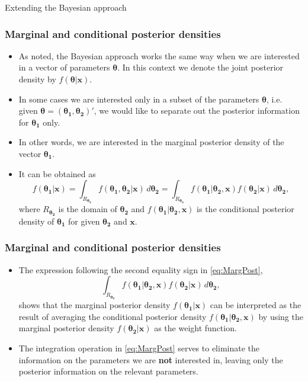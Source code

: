 \documentclass[10pt]{beamer}
\theoremstyle{definition}
\begin{document}
\begin{section}{Extending the Bayesian approach}
\begin{frame}[fragile]
\frametitle{Marginal and conditional posterior densities}
\begin{itemize}\itemsep1em
\item As noted, the Bayesian approach works the same way when we are interested in a vector of parameters $\boldsymbol{\theta}$. In this context we denote the joint posterior density by $f(\boldsymbol{\theta}|\mathbf{x})$.
\item In some cases we are interested only in a subset of the parameters $\boldsymbol{\theta}$, i.e. given $\boldsymbol{\theta}=\left(\boldsymbol{\theta_1},\boldsymbol{\theta_2}\right)'$, we would like to separate out the posterior information for $\boldsymbol{\theta_1}$ only.
\item In other words, we are interested in the marginal posterior density of the vector $\boldsymbol{\theta_1}$.
\item It can be obtained as \begin{equation}
\label{eq:MargPost}f(\boldsymbol{\theta_1}|\mathbf{x}) = \int_{R_{\boldsymbol{\theta_2}}}f(\boldsymbol{\theta_1},\boldsymbol{\theta_2}|\mathbf{x})\,d\boldsymbol{\theta_2} = \int_{R_{\boldsymbol{\theta_2}}}f(\boldsymbol{\theta_1}|\boldsymbol{\theta_2},\mathbf{x})f(\boldsymbol{\theta_2|\mathbf{x}})\,d\boldsymbol{\theta_2},
\end{equation}
where $R_{\boldsymbol{\theta_2}}$ is the domain of $\boldsymbol{\theta_2}$ and $f(\boldsymbol{\theta_1}|\boldsymbol{\theta_2},\mathbf{x})$
is the conditional posterior density of $\boldsymbol{\theta_1}$ for given
$\boldsymbol{\theta_2}$ and $\mathbf{x}$.
\end{itemize}
\end{frame}

\begin{frame}[fragile]
\frametitle{Marginal and conditional posterior densities}
\begin{itemize}\itemsep1em
\item The expression following the second equality sign in \eqref{eq:MargPost}, \[ \int_{R_{\boldsymbol{\theta_2}}}f(\boldsymbol{\theta_1}|\boldsymbol{\theta_2},\mathbf{x})f(\boldsymbol{\theta_2|\mathbf{x}})\,d\boldsymbol{\theta_2}, \] shows that the marginal posterior density $f(\boldsymbol{\theta_1}|\mathbf{x})$ can be interpreted as the result of averaging the conditional posterior density $f(\boldsymbol{\theta_1}|\boldsymbol{\theta_2},\mathbf{x})$ by using the marginal posterior density $f(\boldsymbol{\theta_2}|\mathbf{x})$ as the weight function.
\item The integration operation in \eqref{eq:MargPost} serves to eliminate the information on the parameters we are \textbf{not} interested in, leaving only the posterior information on the relevant parameters.
\end{itemize}
\end{frame}


\end{section}
\end{document}
